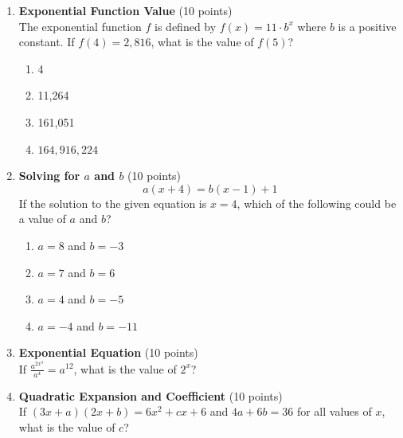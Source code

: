 \begin{enumerate}
  \item \textbf{Exponential Function Value} (10 points)\\
  The exponential function $f$ is defined by $f(x) = 11 \cdot b^x$ where $b$ is a positive constant. If $f(4) = 2,816$, what is the value of $f(5)$?
  \begin{enumerate}[label=\Alph*.]
    \item 4
    \item 11,264
    \item 161,051
    \item $164,916,224$
  \end{enumerate}
  \begin{subanswer}
  \end{subanswer}

  \newpage

  \item \textbf{Solving for $a$ and $b$} (10 points)\\
  \[
    a(x + 4) = b(x - 1) + 1
  \]
  If the solution to the given equation is $x = 4$, which of the following could be a value of $a$ and $b$?
  \begin{enumerate}[label=\Alph*.]
    \item $a = 8$ and $b = -3$
    \item $a = 7$ and $b = 6$
    \item $a = 4$ and $b = -5$
    \item $a = -4$ and $b = -11$
  \end{enumerate}
  \begin{subanswer}
  \end{subanswer}

  \item \textbf{Exponential Equation} (10 points)\\
  If $\frac{a^{2x^3}}{a^4} = a^{12}$, what is the value of $2^x$?
  \begin{subanswer}
  \end{subanswer}

  \item \textbf{Quadratic Expansion and Coefficient} (10 points)\\
  If $(3x + a)(2x + b) = 6x^2 + c x + 6$ and $4a + 6b = 36$ for all values of $x$, what is the value of $c$?
  \begin{subanswer}
  \end{subanswer}


\end{enumerate}
